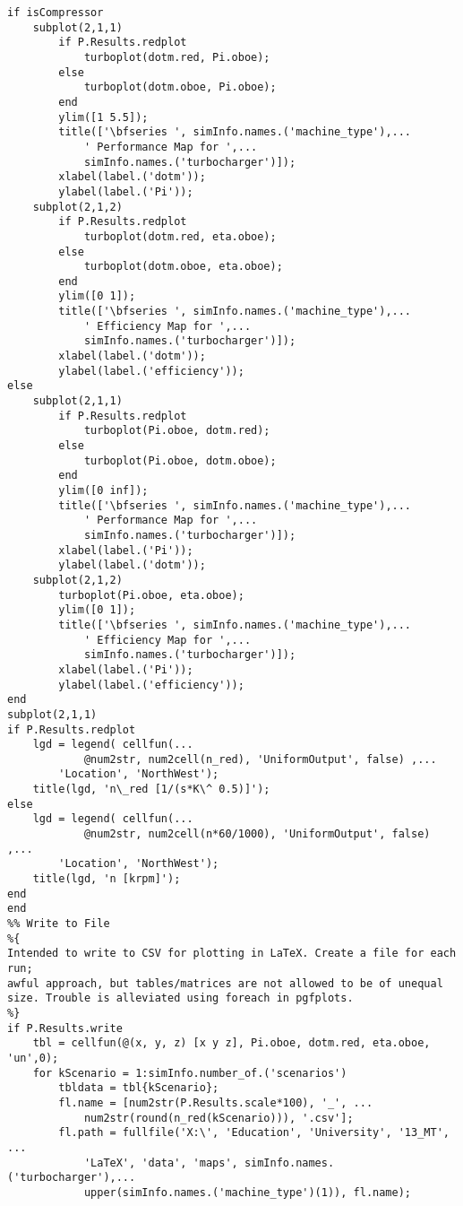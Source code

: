 \begin{lstlisting}
if isCompressor
    subplot(2,1,1)
        if P.Results.redplot
            turboplot(dotm.red, Pi.oboe);
        else
            turboplot(dotm.oboe, Pi.oboe);
        end
        ylim([1 5.5]);
        title(['\bfseries ', simInfo.names.('machine_type'),...
            ' Performance Map for ',...
            simInfo.names.('turbocharger')]);
        xlabel(label.('dotm'));
        ylabel(label.('Pi'));
    subplot(2,1,2)
        if P.Results.redplot
            turboplot(dotm.red, eta.oboe);
        else           
            turboplot(dotm.oboe, eta.oboe);
        end
        ylim([0 1]);
        title(['\bfseries ', simInfo.names.('machine_type'),...
            ' Efficiency Map for ',...
            simInfo.names.('turbocharger')]);
        xlabel(label.('dotm'));
        ylabel(label.('efficiency'));
else
    subplot(2,1,1)
        if P.Results.redplot
            turboplot(Pi.oboe, dotm.red);
        else
            turboplot(Pi.oboe, dotm.oboe);
        end
        ylim([0 inf]);
        title(['\bfseries ', simInfo.names.('machine_type'),...
            ' Performance Map for ',...
            simInfo.names.('turbocharger')]);
        xlabel(label.('Pi'));
        ylabel(label.('dotm'));
    subplot(2,1,2)
        turboplot(Pi.oboe, eta.oboe);
        ylim([0 1]);
        title(['\bfseries ', simInfo.names.('machine_type'),...
            ' Efficiency Map for ',...
            simInfo.names.('turbocharger')]);
        xlabel(label.('Pi'));
        ylabel(label.('efficiency'));
end
subplot(2,1,1)
if P.Results.redplot
    lgd = legend( cellfun(...
            @num2str, num2cell(n_red), 'UniformOutput', false) ,...
        'Location', 'NorthWest');
    title(lgd, 'n\_red [1/(s*K\^ 0.5)]');    
else
    lgd = legend( cellfun(...
            @num2str, num2cell(n*60/1000), 'UniformOutput', false) ,...
        'Location', 'NorthWest');
    title(lgd, 'n [krpm]');
end
end
%% Write to File
%{
Intended to write to CSV for plotting in LaTeX. Create a file for each run;
awful approach, but tables/matrices are not allowed to be of unequal
size. Trouble is alleviated using foreach in pgfplots.
%}
if P.Results.write
    tbl = cellfun(@(x, y, z) [x y z], Pi.oboe, dotm.red, eta.oboe, 'un',0);
    for kScenario = 1:simInfo.number_of.('scenarios')
        tbldata = tbl{kScenario};
        fl.name = [num2str(P.Results.scale*100), '_', ...
            num2str(round(n_red(kScenario))), '.csv'];
        fl.path = fullfile('X:\', 'Education', 'University', '13_MT', ...
            'LaTeX', 'data', 'maps', simInfo.names.('turbocharger'),...
            upper(simInfo.names.('machine_type')(1)), fl.name);

\end{lstlisting}
